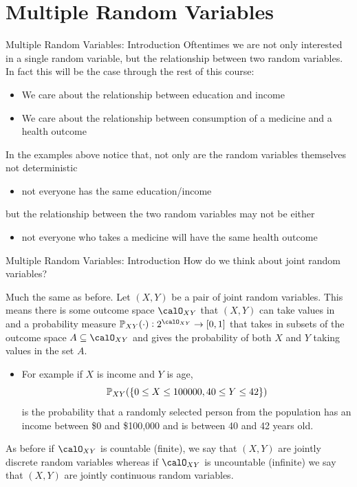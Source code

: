 \documentclass[notheorems,9pt]{beamer}
\begin{document}
\section{Multiple Random Variables}
\begin{frame}{Multiple Random Variables: Introduction} 
	\label{frame:mrv-intro1}
	Oftentimes we are not only interested in a single random variable, but the relationship between two random variables. In fact this will be the case through the rest of this course:
	\begin{itemize}
		\item We care about the relationship between education and income
		\item We care about the relationship between consumption of a medicine and a health outcome
	\end{itemize}
	In the examples above notice that, not only are the random variables themselves not deterministic 
	\begin{itemize}
		\item not everyone has the same education/income
	\end{itemize}
	but the relationship between the two random variables may not be either
	\begin{itemize}
		\item not everyone who takes a medicine will have the same health outcome
	\end{itemize}
\end{frame}
\begin{frame}{Multiple Random Variables: Introduction} 
	\label{frame:mrv-intro2}
	 How do we think about joint random variables?

	 Much the same as before. Let \((X,Y)\) be a pair of joint random variables. This means there is some outcome space \(\calO_{XY}\) that \((X,Y)\) can take values in and a probability measure \(\P_{XY}(\cdot): 2^{\calO_{XY}}\to[0,1]\) that takes in subsets of the outcome space \(A\subseteq \calO_{XY}\) and gives the probability of both \(X\) and \(Y\) taking values in the set \(A\).
	\begin{itemize}
		\item For example if \(X\) is income and \(Y\) is age, \[\P_{XY}(\{0\leq X\leq 100000, 40\leq Y\leq 42\})\] is the probability that a randomly selected person from the population has an income between \$0 and \$100,000 and is between 40 and 42 years old.
	\end{itemize}
	As before if \(\calO_{XY}\) is countable (finite), we say that \((X,Y)\) are jointly discrete random variables whereas if \(\calO_{XY}\) is uncountable (infinite) we say that \((X,Y)\) are jointly continuous random variables.
\end{frame}
\end{document}

